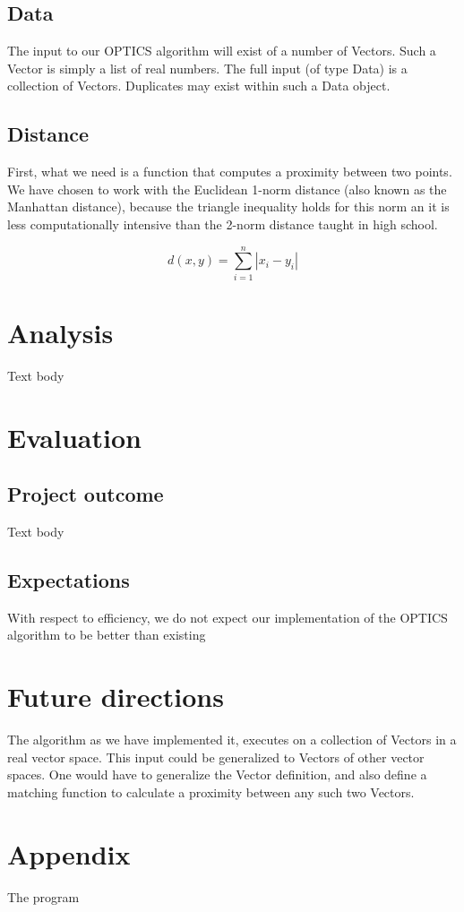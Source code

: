 \documentclass[12pt,a4paper]{article}
\begin{document}
\subsection{Data}
The input to our OPTICS algorithm will exist of a number of Vectors. Such a Vector is simply a list of real numbers. The full input (of type Data) is a collection of Vectors. Duplicates may exist within such a Data object.

\subsection{Distance}
First, what we need is a function that computes a proximity between two points. We have chosen to work with the Euclidean 1-norm distance (also known as the Manhattan distance), because the triangle inequality holds for this norm an it is less computationally intensive than the 2-norm distance taught in high school.

\begin{equation}
d(x,y)=\sum_{i=1}^n |x_i-y_i|
\end{equation}

\clearpage
\section{Analysis}
Text body

\section{Evaluation}
\subsection{Project outcome}
Text body
\subsection{Expectations}
With respect to efficiency, we do not expect our implementation of the OPTICS algorithm to be better than existing 

\section{Future directions}
The algorithm as we have implemented it, executes on a collection of Vectors in a real vector space. This input could be generalized to Vectors of other vector spaces. One would have to generalize the Vector definition, and also define a matching function to calculate a proximity between any such two Vectors.

\clearpage
\section{Appendix}
The program
\end{document}

